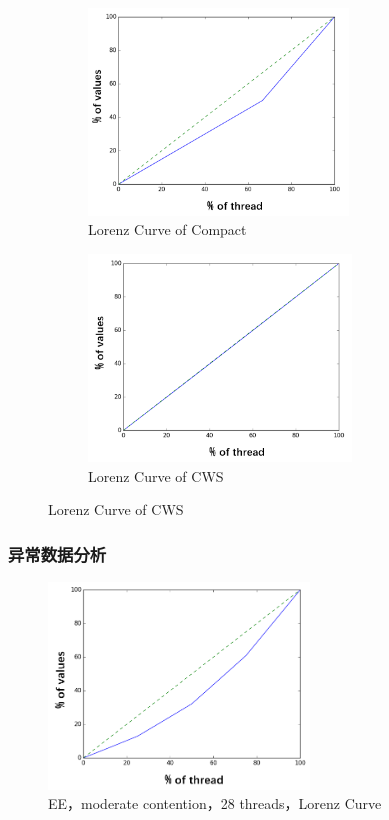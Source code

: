 \begin{figure}[!htp]
  \centering
  \begin{subfigure}{8.0cm}
    \centering
    \includegraphics[height=5.5cm]{figure/compact-high-12.png}
    \caption{Lorenz Curve of Compact}
  \end{subfigure}
  \hspace{1em}
  \begin{subfigure}{6.0cm}
    \centering
    \includegraphics[height=5.5cm]{figure/CWS-high-12.PNG}
    \caption{Lorenz Curve of CWS}
  \end{subfigure}
  \label{fig:high-12}
\end{figure}



\subsubsection{异常数据分析}

\begin{figure}[t]
	\centering
	\includegraphics[height=5.5cm]{figure/Even-moderate-28.png}
	\caption{EE，moderate contention，28 threads，Lorenz Curve}
	\label{Fig:Even-moderate-28}
\end{figure}

